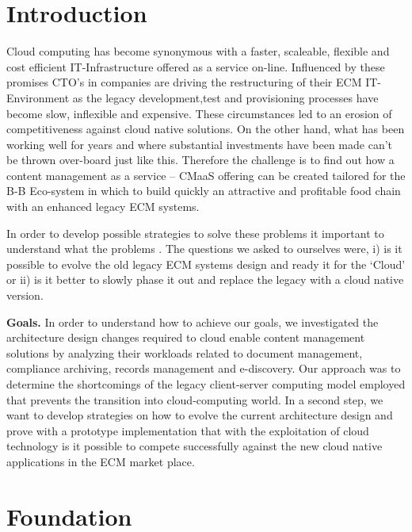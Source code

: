 \documentclass[EPiC]{easychair} %
\begin{document}
\section{Introduction}
\label{sect:introduction}

Cloud computing has become synonymous with a faster, scaleable, flexible and cost efficient IT-Infrastructure offered as a service on-line. Influenced by these promises CTO's in companies are driving the restructuring of their ECM IT-Environment as the legacy development,test and provisioning processes have become slow, inflexible and expensive. These circumstances led to an erosion of competitiveness against cloud native solutions. On the other hand, what has been working well for years and where substantial investments have been made can't be thrown over-board just like this. Therefore the challenge is to find out how a content management as a service – CMaaS  offering can be created tailored for the B-B Eco-system in which to build quickly an attractive and profitable food chain with an enhanced legacy ECM systems.

In order to develop possible strategies to solve these problems it important to understand what the problems . The questions we asked to ourselves were, i) is it possible to evolve the old legacy ECM systems design and ready it for the ‘Cloud’ or ii) is it better to slowly phase it out and replace the legacy with a cloud native version.

\textbf{Goals.} 
In order to understand how to achieve our goals, we investigated the architecture design changes required to cloud enable content management solutions by analyzing their workloads related to document management, compliance archiving, records management and e-discovery. Our approach was to determine the shortcomings of the legacy client-server computing model employed that prevents the transition into cloud-computing world. In a second step, we want to develop strategies on how to evolve the current architecture design and prove with a prototype implementation that with the exploitation of cloud technology is it possible to compete successfully against the new cloud native applications in the ECM market place. 

\section{Foundation}
\label{sect:foundation}
\end{document}
